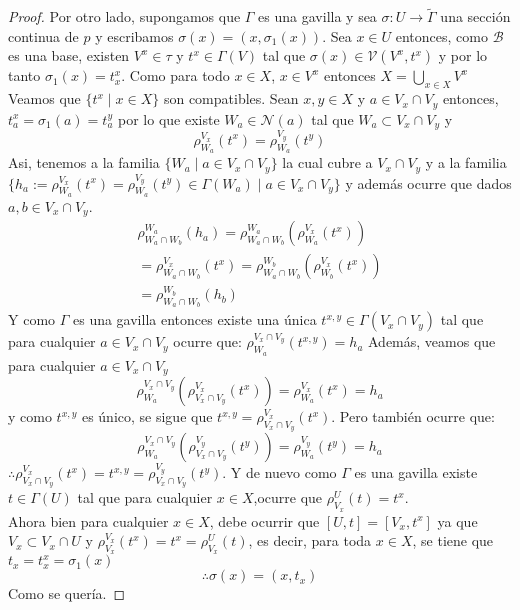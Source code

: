 \documentclass[14pt]{extarticle}
\begin{document}
\begin{proof}
    Por otro lado, supongamos que $\Gamma$ es una gavilla
    y sea $\sigma:U \rightarrow \widetilde{\Gamma}$
    una sección continua de $p$ y escribamos $\sigma(x)=(x,\sigma_1(x))$.
    Sea $x\in U$ entonces, como $\mathcal{B}$ es una base, existen
    $V^x\in \tau$ y $t^x\in \Gamma(V)$ tal que
    $\sigma(x)\in \mathcal{V}(V^x,t^x)$ y por lo tanto
    $\sigma_1(x)=t^x_x$. Como para todo $x\in X$,
    $x\in V^x$ entonces $X = \bigcup_{x\in X}V^x$
    Veamos que $\{t^x\mid x\in X\}$ son compatibles.
    Sean $x,y\in X$ y $a\in V_x\cap V_y$ entonces,
    $t^x_a=\sigma_1(a)=t^y_a$ por lo que existe $W_a\in \mathcal{N}(a)$
    tal que $W_a\subset V_x\cap V_y$ y 
    \begin{equation*}
        \rho_{W_a}^{V_x}(t^x) = \rho_{W_a}^{V_y}(t^y)
    \end{equation*}
    Asi, tenemos a la familia $\{W_a\mid a\in V_x\cap V_y\}$
    la cual cubre a $V_x\cap V_y$ y a la familia
    $\{h_a:=\rho_{W_a}^{V_x}(t^x) = \rho_{W_a}^{V_y}(t^y)\in 
    \Gamma(W_a)\mid a\in V_x\cap V_y\}$
    y además ocurre que
    dados $a,b\in V_x\cap V_y$.
    \begin{align*}
        \rho_{W_a\cap W_b}^{W_a}(h_a)
        =\rho_{W_a\cap W_b}^{W_a}(\rho_{W_a}^{V_x}(t^x))\\
        =\rho_{W_a\cap W_b}^{V_x}(t^x)
        =\rho_{W_a\cap W_b}^{W_b}(\rho_{W_b}^{V_x}(t^x))\\
        =\rho_{W_a\cap W_b}^{W_b}(h_b)
    \end{align*}
    Y como $\Gamma$ es una gavilla entonces existe
    una única $t^{x,y}\in \Gamma (V_x\cap V_y)$ tal que 
    para cualquier $a\in V_x\cap V_y$ ocurre que:
    $\rho_{W_a}^{V_x\cap V_y}(t^{x,y})=h_a$
    Además, veamos que para cualquier $a\in V_x\cap V_y$
    $$\rho_{W_a}^{V_x\cap V_y}(\rho_{V_x\cap V_y}^{V_x}(t^x))= \rho_{W_a}^{V_x}(t^x)=h_a$$
    y como $t^{x,y}$ es único, se sigue que 
    $t^{x,y}=\rho_{V_x\cap V_y}^{V_x}(t^x)$.
    Pero también ocurre que:
    $$\rho_{W_a}^{V_x\cap V_y}(\rho_{V_x\cap V_y}^{V_y}(t^y))= \rho_{W_a}^{V_y}(t^y)=h_a$$
    $\therefore \rho_{V_x\cap V_y}^{V_x}(t^x)=t^{x,y}=\rho_{V_x\cap V_y}^{V_y}(t^y)$.
    Y de nuevo como $\Gamma$ es una gavilla
    existe $t\in \Gamma(U)$ tal que para cualquier
    $x\in X$,ocurre que $\rho_{V_x}^{U}(t)=t^x$.\\
    Ahora bien para cualquier $x\in X$,
    debe ocurrir que $[U,t]=[V_x,t^x]$ ya que
    $V_x\subset V_x\cap U$ y $\rho_{V_x}^{V_x}(t^x)=t^x=\rho_{V_x}^{U}(t)$,
    es decir, para toda $x\in X$, se tiene que $t_x=t^x_x=\sigma_1(x)$
    $$\therefore \sigma(x)= (x,t_x)$$
    Como se quería.
\end{proof}
\end{document}

